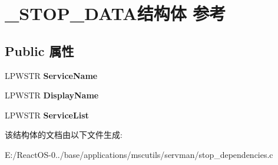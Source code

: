 \hypertarget{struct___s_t_o_p___d_a_t_a}{}\section{\+\_\+\+S\+T\+O\+P\+\_\+\+D\+A\+T\+A结构体 参考}
\label{struct___s_t_o_p___d_a_t_a}
\subsection*{Public 属性}
\begin{DoxyCompactItemize}
\item 
\mbox{\label{struct___s_t_o_p___d_a_t_a_a4a6145376e2a3e7ef6425728c2f39e55}} 
L\+P\+W\+S\+TR {\bfseries Service\+Name}
\item 
\mbox{\label{struct___s_t_o_p___d_a_t_a_a503f19438f9e99b856e48fa6b8e9de25}} 
L\+P\+W\+S\+TR {\bfseries Display\+Name}
\item 
\mbox{\label{struct___s_t_o_p___d_a_t_a_ae468c53b49fd1cb64b2052a835ed05ab}} 
L\+P\+W\+S\+TR {\bfseries Service\+List}
\end{DoxyCompactItemize}


该结构体的文档由以下文件生成\+:\begin{DoxyCompactItemize}
\item 
E\+:/\+React\+O\+S-\/0../base/applications/mscutils/servman/stop\+\_\+dependencies.\+c\end{DoxyCompactItemize}
